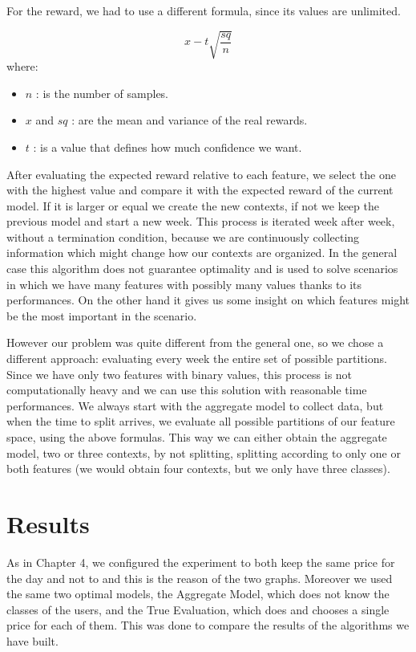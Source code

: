	For the reward, we had to use a different formula, since its values are unlimited.

\begin{equation}
	x - t \sqrt{\frac{sq} {n}}
\end{equation}
where:
\begin{itemize}
	\item $n$ : is the number of samples.
	\item $x$ and $sq$ : are the mean and variance of the real rewards.
	\item $t$ : is a value that defines how much confidence we want.
\end{itemize}

After evaluating the expected reward relative to each feature, we select the one with the highest value and compare it with the expected reward of the current model.
If it is larger or equal we create the new contexts, if not we keep the previous model and start a new week.
This process is iterated week after week, without a termination condition, because we are continuously collecting information which might change how our contexts are organized.
In the general case this algorithm does not guarantee optimality and is used to solve scenarios in which we have many features with possibly many values thanks to its performances.
On the other hand it gives us some insight on which features might be the most important in the scenario.

However our problem was quite different from the general one, so we chose a different approach: evaluating every week the entire set of possible partitions.
Since we have only two features with binary values, this process is not computationally heavy and we can use this solution with reasonable time performances.
We always start with the aggregate model to collect data, but when the time to split arrives, we evaluate all possible partitions of our feature space, using the above formulas.
This way we can either obtain the aggregate model, two or three contexts, by not splitting, splitting according to only one or both features (we would obtain four contexts, but we only have three classes).

\section{Results}\label{sec:our-result}

As in Chapter 4, we configured the experiment to both keep the same price for the day and not to and this is the reason of the two graphs.
Moreover we used the same two optimal models, the Aggregate Model, which does not know the classes of the users, and the True Evaluation, which does and chooses a single price for each of them.
This was done to compare the results of the algorithms we have built.

